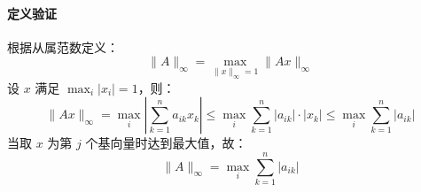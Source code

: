 \paragraph{定义验证}  
根据从属范数定义：
\[
\|A\|_\infty = \max_{\|x\|_\infty=1} \|Ax\|_\infty
\]
设 \(x\) 满足 \(\max_i |x_i| = 1\)，则：
\[
\|Ax\|_\infty = \max_i \left| \sum_{k=1}^n a_{ik}x_k \right| \leq \max_i \sum_{k=1}^n |a_{ik}| \cdot |x_k| \leq \max_i \sum_{k=1}^n |a_{ik}|
\]
当取 \(x\) 为第 \(j\) 个基向量时达到最大值，故：
\[
\|A\|_\infty = \max_i \sum_{k=1}^n |a_{ik}|
\]